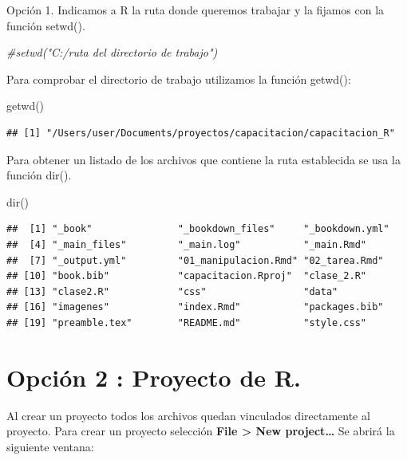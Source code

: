 \documentclass[
]{book}
\newenvironment{Shaded}{\begin{snugshade}}{\end{snugshade}}
\newcommand{\CommentTok}[1]{\textcolor[rgb]{0.56,0.35,0.01}{\textit{#1}}}
\newcommand{\FunctionTok}[1]{\textcolor[rgb]{0.00,0.00,0.00}{#1}}
\newcommand{\NormalTok}[1]{#1}
\begin{document}
Opción 1. Indicamos a R la ruta donde queremos trabajar y la fijamos con la función setwd().

\begin{Shaded}
\begin{Highlighting}[]
\CommentTok{\#setwd("C:/ruta del directorio de trabajo")}
\end{Highlighting}
\end{Shaded}

Para comprobar el directorio de trabajo utilizamos la función getwd():

\begin{Shaded}
\begin{Highlighting}[]
\FunctionTok{getwd}\NormalTok{()}
\end{Highlighting}
\end{Shaded}

\begin{verbatim}
## [1] "/Users/user/Documents/proyectos/capacitacion/capacitacion_R"
\end{verbatim}

Para obtener un listado de los archivos que contiene la ruta establecida se usa la función dir().

\begin{Shaded}
\begin{Highlighting}[]
\FunctionTok{dir}\NormalTok{()}
\end{Highlighting}
\end{Shaded}

\begin{verbatim}
##  [1] "_book"               "_bookdown_files"     "_bookdown.yml"      
##  [4] "_main_files"         "_main.log"           "_main.Rmd"          
##  [7] "_output.yml"         "01_manipulacion.Rmd" "02_tarea.Rmd"       
## [10] "book.bib"            "capacitacion.Rproj"  "clase_2.R"          
## [13] "clase2.R"            "css"                 "data"               
## [16] "imagenes"            "index.Rmd"           "packages.bib"       
## [19] "preamble.tex"        "README.md"           "style.css"
\end{verbatim}

\hypertarget{opciuxf3n-2-proyecto-de-r.}{%
\section{Opción 2 : Proyecto de R.}\label{opciuxf3n-2-proyecto-de-r.}}

Al crear un proyecto todos los archivos quedan vinculados directamente al proyecto. Para crear un proyecto selección \textbf{File \textgreater{} New project\ldots{}} Se abrirá la siguiente ventana:
\end{document}
